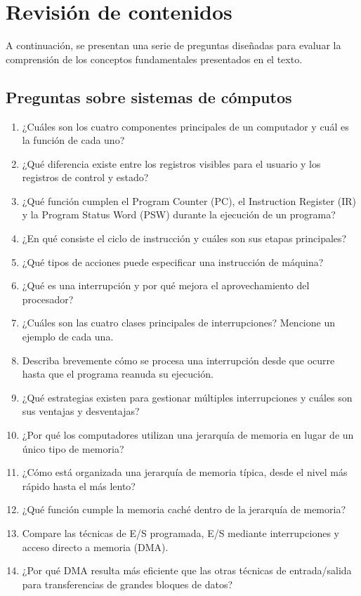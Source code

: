 \section{Revisión de contenidos}

A continuación, se presentan una serie de preguntas diseñadas para evaluar la comprensión de los conceptos fundamentales presentados en el texto.

\subsection{Preguntas sobre sistemas de cómputos}

\begin{enumerate}
  \item ¿Cuáles son los cuatro componentes principales de un computador y cuál es la función de cada uno?
  \item ¿Qué diferencia existe entre los registros visibles para el usuario y los registros de control y estado?
  \item ¿Qué función cumplen el Program Counter (PC), el Instruction Register (IR) y la Program Status Word (PSW) durante la ejecución de un programa?
  \item ¿En qué consiste el ciclo de instrucción y cuáles son sus etapas principales?
  \item ¿Qué tipos de acciones puede especificar una instrucción de máquina?
  \item ¿Qué es una interrupción y por qué mejora el aprovechamiento del procesador?
  \item ¿Cuáles son las cuatro clases principales de interrupciones? Mencione un ejemplo de cada una.
  \item Describa brevemente cómo se procesa una interrupción desde que ocurre hasta que el programa reanuda su ejecución.
  \item ¿Qué estrategias existen para gestionar múltiples interrupciones y cuáles son sus ventajas y desventajas?
  \item ¿Por qué los computadores utilizan una jerarquía de memoria en lugar de un único tipo de memoria?
  \item ¿Cómo está organizada una jerarquía de memoria típica, desde el nivel más rápido hasta el más lento?
  \item ¿Qué función cumple la memoria caché dentro de la jerarquía de memoria?
  \item Compare las técnicas de E/S programada, E/S mediante interrupciones y acceso directo a memoria (DMA).
  \item ¿Por qué DMA resulta más eficiente que las otras técnicas de entrada/salida para transferencias de grandes bloques de datos?
\end{enumerate}

